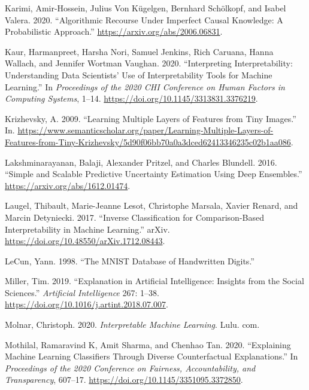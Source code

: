 \documentclass{juliacon}
\newlength{\cslhangindent}
\newenvironment{CSLReferences}[2] %
 {\begin{list}{}{%
  \setlength{\itemindent}{0pt}
  \setlength{\leftmargin}{0pt}
  \setlength{\parsep}{0pt}
  \ifodd #1
   \setlength{\leftmargin}{\cslhangindent}
   \setlength{\itemindent}{-1\cslhangindent}
  \fi
  \setlength{\itemsep}{#2\baselineskip}}}
 {\end{list}}
\begin{document}
\begin{CSLReferences}{1}{0}
Karimi, Amir-Hossein, Julius Von Kügelgen, Bernhard Schölkopf, and
Isabel Valera. 2020. {``Algorithmic Recourse Under Imperfect Causal
Knowledge: A Probabilistic Approach.''}
\url{https://arxiv.org/abs/2006.06831}.

Kaur, Harmanpreet, Harsha Nori, Samuel Jenkins, Rich Caruana, Hanna
Wallach, and Jennifer Wortman Vaughan. 2020. {``Interpreting
Interpretability: Understanding Data Scientists' Use of Interpretability
Tools for Machine Learning.''} In \emph{Proceedings of the 2020 {CHI}
Conference on Human Factors in Computing Systems}, 1--14.
\url{https://doi.org/10.1145/3313831.3376219}.

Krizhevsky, A. 2009. {``Learning {Multiple} {Layers} of {Features} from
{Tiny} {Images}.''} In.
\url{https://www.semanticscholar.org/paper/Learning-Multiple-Layers-of-Features-from-Tiny-Krizhevsky/5d90f06bb70a0a3dced62413346235c02b1aa086}.

Lakshminarayanan, Balaji, Alexander Pritzel, and Charles Blundell. 2016.
{``Simple and Scalable Predictive Uncertainty Estimation Using Deep
Ensembles.''} \url{https://arxiv.org/abs/1612.01474}.

Laugel, Thibault, Marie-Jeanne Lesot, Christophe Marsala, Xavier Renard,
and Marcin Detyniecki. 2017. {``Inverse {Classification} for
{Comparison}-Based {Interpretability} in {Machine} {Learning}.''} arXiv.
\url{https://doi.org/10.48550/arXiv.1712.08443}.

LeCun, Yann. 1998. {``The {MNIST} Database of Handwritten Digits.''}

Miller, Tim. 2019. {``Explanation in Artificial Intelligence: {Insights}
from the Social Sciences.''} \emph{Artificial Intelligence} 267: 1--38.
\url{https://doi.org/10.1016/j.artint.2018.07.007}.

Molnar, Christoph. 2020. \emph{Interpretable Machine Learning}. {Lulu.
com}.

Mothilal, Ramaravind K, Amit Sharma, and Chenhao Tan. 2020.
{``Explaining Machine Learning Classifiers Through Diverse
Counterfactual Explanations.''} In \emph{Proceedings of the 2020
{Conference} on {Fairness}, {Accountability}, and {Transparency}},
607--17. \url{https://doi.org/10.1145/3351095.3372850}.


\end{CSLReferences}
\end{document}
